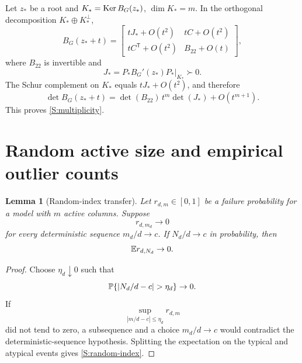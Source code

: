 \documentclass[
  aps,
  prl,
  10pt,
  onecolumn,
  longbibliography,
  nofootinbib
]{revtex4-2}
\newtheorem{lemma}[theorem]{Lemma}
\theoremstyle{remark}
\begin{document}
Let $z_*$ be a root and $K_*=\operatorname{Ker} B_G(z_*)$, $\dim K_*=m$. In the orthogonal decomposition $K_*\oplus K_*^\perp$,
\begin{equation}
B_G(z_*+t)=
\begin{bmatrix}
tJ_*+O(t^2)&tC+O(t^2)\\
tC^{\mathsf T}+O(t^2)&B_{22}+O(t)
\end{bmatrix},
\end{equation}
where $B_{22}$ is invertible and
\begin{equation}
J_*=\left.P_*B_G'(z_*)P_*\right|_{K_*}\succ0.
\end{equation}
The Schur complement on $K_*$ equals $tJ_*+O(t^2)$, and therefore
\begin{equation}
\det B_G(z_*+t)
=
\det(B_{22})\,t^m\det(J_*)+O(t^{m+1}).
\end{equation}
This proves \eqref{S:multiplicity}.

\section{Random active size and empirical outlier counts}

\begin{lemma}[Random-index transfer]
Let $r_{d,m}\in[0,1]$ be a failure probability for a model with $m$ active columns. Suppose
\begin{equation}
r_{d,m_d}\to0
\end{equation}
for every deterministic sequence $m_d/d\to c$. If $N_d/d\to c$ in probability, then
\begin{equation}
\mathbb{E} r_{d,N_d}\to0.
\label{S:random-index}
\end{equation}
\end{lemma}

\begin{proof}
Choose $\eta_d\downarrow0$ such that
\begin{equation}
\Pp\{|N_d/d-c|>\eta_d\}\to0.
\end{equation}
If
\begin{equation}
\sup_{|m/d-c|\le\eta_d}r_{d,m}
\end{equation}
did not tend to zero, a subsequence and a choice $m_d/d\to c$ would contradict the deterministic-sequence hypothesis. Splitting the expectation on the typical and atypical events gives \eqref{S:random-index}.
\end{proof}
\end{document}
